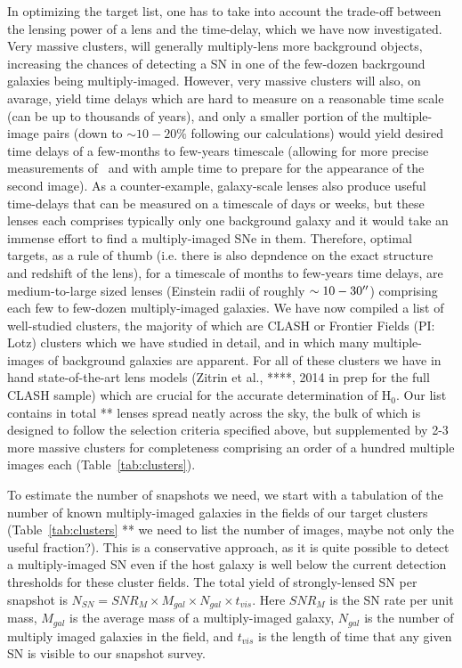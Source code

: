 In optimizing the target list, one has to take into account the trade-off between the lensing power of a lens and the time-delay, which we have now investigated. Very massive clusters, will generally multiply-lens more background objects, increasing the chances of detecting a SN in one of the few-dozen backrgound galaxies being multiply-imaged. However, very massive clusters will also, on avarage, yield time delays which are hard to measure on a reasonable time scale (can be up to thousands of years), and only a smaller portion of the multiple-image pairs (down to $\sim10-20\%$ following our calculations) would yield desired time delays of a few-months to few-years timescale (allowing for more precise measurements of \dt~and with ample time to prepare for the
appearance of the second image). As a counter-example, galaxy-scale lenses also produce useful time-delays that can be measured on a timescale of days or weeks, but these lenses each comprises typically only one background galaxy and it would take an immense effort to find a multiply-imaged SNe in them. Therefore, optimal targets, as a rule of thumb (i.e. there is also depndence on the exact structure and redshift of the lens), for a timescale of months to few-years time delays, are medium-to-large sized lenses (Einstein radii of roughly $\sim10-30^{\prime\prime}$) comprising each few to few-dozen multiply-imaged galaxies.  We have now compiled a list of well-studied clusters, the majority of which are CLASH or Frontier Fields (PI: Lotz) clusters which we have studied in detail, and in which many multiple-images of background galaxies are apparent. For all of these clusters we have in hand state-of-the-art lens models (Zitrin et al., ****, 2014 in prep for the full CLASH sample) which are crucial for the accurate determination of H$_{0}$. Our list contains in total ** lenses spread neatly across the sky, the bulk of which is designed to follow the selection criteria specified above, but supplemented by 2-3 more massive clusters for completeness comprising an order of a hundred multiple images each (Table~\ref{tab:clusters}). 



\medskip
{} To estimate the number of snapshots we need, we start with a
tabulation of the number of known multiply-imaged galaxies in the
fields of our target clusters (Table~\ref{tab:clusters} ** we need to list the number of images, maybe not only the useful fraction?).  This is a
conservative approach, as it is quite possible to detect a
multiply-imaged SN even if the host galaxy is well below the current
detection thresholds for these cluster fields. The total yield of
strongly-lensed SN per snapshot is 
$N_{SN} = SNR_{M} \times M_{gal} \times N_{gal} \times t_{vis}$. 
Here $SNR_M$ is the SN rate per unit mass, $M_{gal}$ is
the average mass of a multiply-imaged galaxy, $N_{gal}$ is the number
of multiply imaged galaxies in the field, and $t_{vis}$ is the length
of time that any given SN is visible to our snapshot survey.  

